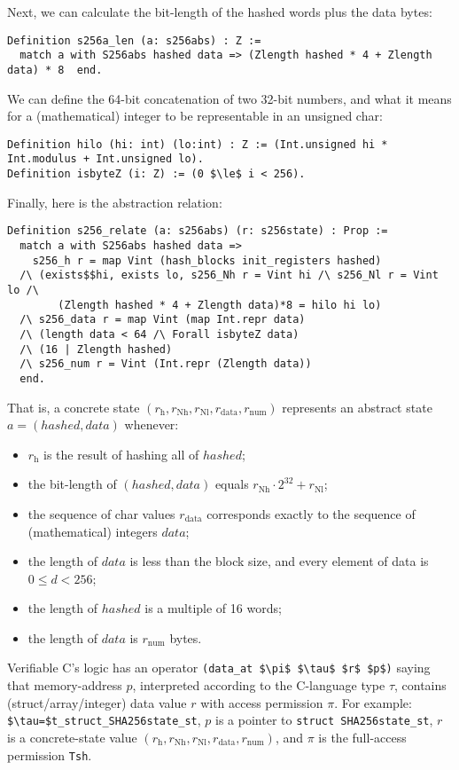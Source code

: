 \documentclass[prodmode,acmtoplas]{acmsmall}
\begin{document}
Next, we can calculate the bit-length
of the hashed words plus the data bytes:
\begin{lstlisting}
Definition s256a_len (a: s256abs) : Z := 
  match a with S256abs hashed data => (Zlength hashed * 4 + Zlength data) * 8  end.
\end{lstlisting}
We can define the 64-bit concatenation
of two 32-bit numbers,
and what it means for a (mathematical) integer
to be representable in an unsigned char:
\begin{lstlisting}
Definition hilo (hi: int) (lo:int) : Z := (Int.unsigned hi * Int.modulus + Int.unsigned lo).
Definition isbyteZ (i: Z) := (0 $\le$ i < 256).
\end{lstlisting}
Finally, here is the abstraction relation:
\begin{lstlisting}
Definition s256_relate (a: s256abs) (r: s256state) : Prop :=
  match a with S256abs hashed data =>
    s256_h r = map Vint (hash_blocks init_registers hashed) 
  /\ (exists$$hi, exists lo, s256_Nh r = Vint hi /\ s256_Nl r = Vint lo /\
        (Zlength hashed * 4 + Zlength data)*8 = hilo hi lo)
  /\ s256_data r = map Vint (map Int.repr data)
  /\ (length data < 64 /\ Forall isbyteZ data)
  /\ (16 | Zlength hashed)
  /\ s256_num r = Vint (Int.repr (Zlength data))
  end.
\end{lstlisting}
That is, 
a concrete state $(
r_\mathrm{h},
r_\mathrm{Nh},
r_\mathrm{Nl},
r_\mathrm{data},
r_\mathrm{num})$
represents an abstract state $a=(\mathit{hashed},\mathit{data})$
whenever:
\begin{itemize}
\item $r_\mathrm{h}$ is the result of hashing
all of $\mathit{hashed}$;
\item the bit-length of $(\mathit{hashed},\mathit{data})$ equals
$r_\mathrm{Nh}\cdot 2^{32}+r_\mathrm{Nl}$;
\item the sequence of char values $r_\mathrm{data}$
corresponds exactly to the sequence of (mathematical)
integers $\mathit{data}$;
\item the length of $\mathit{data}$ is less than the block
size, and every element of data is $0 \le d < 256$;
\item the length of $\mathit{hashed}$ is a multiple of 16 words;
\item the length of $\mathit{data}$
is $r_\mathrm{num}$ bytes.
\end{itemize}

Verifiable C's logic has an operator 
\lstinline{(data_at $\pi$ $\tau$ $r$ $p$)}
saying that memory-address $p$,
interpreted according to the C-language type $\tau$,
contains (struct/array/integer) data value $r$
with access permission $\pi$.
For example: \lstinline{$\tau=$t_struct_SHA256state_st},
$p$ is a pointer to \lstinline{struct SHA256state_st},
$r$ is a concrete-state value 
$(
r_\mathrm{h},
r_\mathrm{Nh},
r_\mathrm{Nl},
r_\mathrm{data},
r_\mathrm{num})$,
and $\pi$ is the full-access permission \lstinline{Tsh}.
\end{document}
